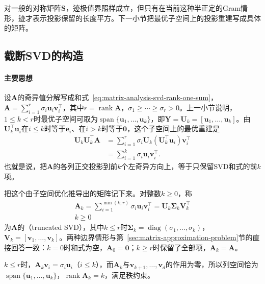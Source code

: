 对一般的对称矩阵$\bm S$，迹极值界照样成立，但只有在当前这种半正定的Gram情形，迹才表示投影保留的长度平方。下一小节把最优子空间上的投影重建写成具体的矩阵。

\subsection{截断SVD的构造}
\label{sec:ls-truncated-svd-construction}

\paragraph{主要思想}

设$\bm A$的奇异值分解写成和式~\eqref{eq:matrix-analysis-svd-rank-one-sum}，$\bm A=\sum_{i=1}^r\sigma_i\bm u_i\bm v_i^\top$，其中$r=\operatorname{rank}\bm A$，$\sigma_1\geq\cdots\geq\sigma_r>0$。上一小节说明，$1\leq k<r$时最优子空间可取为$\operatorname{span}\{\bm u_1,\ldots,\bm u_k\}$，即$\bm Y=\bm U_k=[\bm u_1,\ldots,\bm u_k]$。由$\bm U_k^\top\bm u_i$在$i\leq k$时等于$\bm e_i$、在$i>k$时等于$\bm0$，这个子空间上的最优重建是
\[
 \begin{aligned}
 \bm U_k\bm U_k^\top\bm A
 &=\sum_{i=1}^r\sigma_i\bm U_k(\bm U_k^\top\bm u_i)\bm v_i^\top\\
 &=\sum_{i=1}^k\sigma_i\bm u_i\bm v_i^\top .
 \end{aligned}
\]
也就是说，把$\bm A$的各列正交投影到前$k$个左奇异方向上，等于只保留SVD和式的前$k$项。

把这个由子空间优化推导出的矩阵记下来。对整数$k\geq0$，称
\begin{equation}
\begin{gathered}
\bm A_k=\sum_{i=1}^{\min(k,r)}\sigma_i\bm u_i\bm v_i^\top
 =\bm U_k\bm\Sigma_k\bm V_k^\top\\
k\geq0
\end{gathered}
\label{eq:matrix-analysis-truncated-svd}
\end{equation}
为$\bm A$的（truncated SVD），其中$k\leq r$时$\bm\Sigma_k=\operatorname{diag}(\sigma_1,\ldots,\sigma_k)$，$\bm V_k=[\bm v_1,\ldots,\bm v_k]$。两种边界情形与第~\ref{sec:matrix-approximation-problem}节的直接回答一致：$k=0$时和式为空，$\bm A_0=\bm0$；$k\geq r$时保留了全部项，$\bm A_k=\bm A$。

$k\leq r$时，$\bm A_k\bm v_i=\sigma_i\bm u_i$（$i\leq k$），而$\bm A_k$与$\bm v_{k+1},\ldots,\bm v_d$的作用为零，所以列空间恰为$\operatorname{span}\{\bm u_1,\ldots,\bm u_k\}$，$\operatorname{rank}\bm A_k=k$，满足秩约束。

